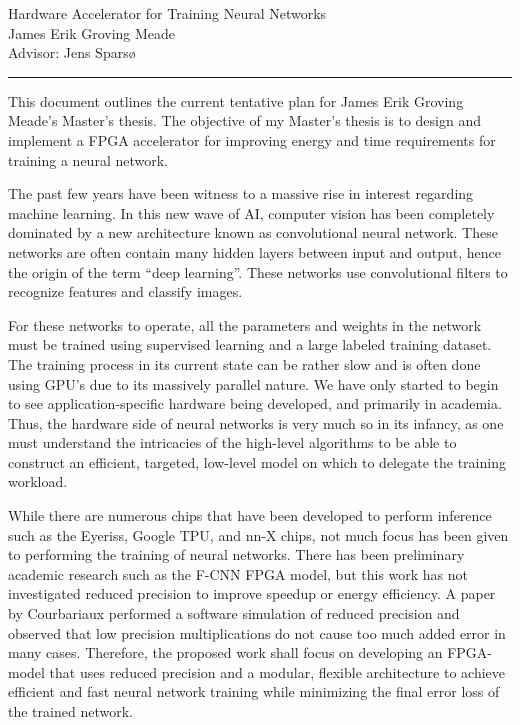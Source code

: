 \documentclass[a4paper]{article}
\begin{document}
	\begin{center}
		\Large {Hardware Accelerator for Training Neural Networks}\\
		\large
		James Erik Groving Meade\\
		Advisor: Jens Sparsø
		\hrule
		\bigskip
	\end{center}
\normalsize 

This document outlines the current tentative plan for James Erik Groving Meade's Master's thesis. The objective of my Master's thesis is to design and implement a FPGA accelerator for improving energy and time requirements for training a neural network.
\par 
The past few years have been witness to a massive rise in interest regarding machine learning. In this new wave of AI, computer vision has been completely dominated by a new architecture known as convolutional neural network. These networks are often contain many hidden layers between input and output, hence the origin of the term ``deep learning''. These networks use convolutional filters to recognize features and classify images.
\par 
For these networks to operate, all the parameters and weights in the network must be trained using supervised learning and a large labeled training dataset. The training process in its current state can be rather slow and is often done using GPU's due to its massively parallel nature. We have only started to begin to see application-specific hardware being developed, and primarily in academia. Thus, the hardware side of neural networks is very much so in its infancy, as one must understand the intricacies of the high-level algorithms to be able to construct an efficient, targeted, low-level model on which to delegate the training workload.
\par 
While there are numerous chips that have been developed to perform inference such as the Eyeriss, Google TPU, and nn-X chips, not much focus has been given to performing the training of neural networks. There has been preliminary academic research such as the F-CNN FPGA model, but this work has not investigated reduced precision to improve speedup or energy efficiency. A paper by Courbariaux performed a software simulation of reduced precision and observed that low precision multiplications do not cause too much added error in many cases. Therefore, the proposed work shall focus on developing an FPGA-model that uses reduced precision and a modular, flexible architecture to achieve efficient and fast neural network training while minimizing the final error loss of the trained network.
\end{document}
